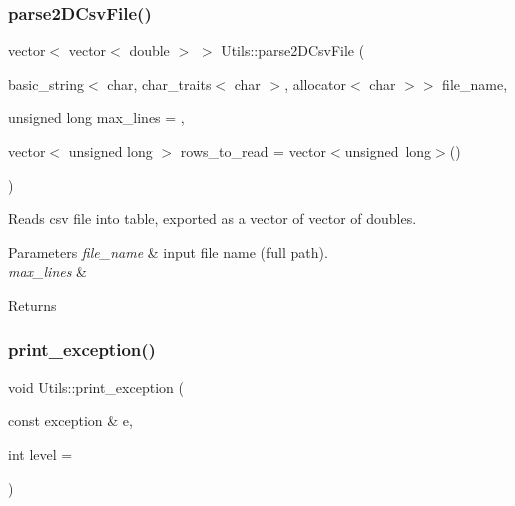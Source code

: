 \subsubsection{\texorpdfstring{parse2\+D\+Csv\+File()}{parse2DCsvFile()}}
{\footnotesize\ttfamily vector$<$ vector$<$ double $>$ $>$ Utils\+::parse2\+D\+Csv\+File (\begin{DoxyParamCaption}\item[{basic\+\_\+string$<$ char, char\+\_\+traits$<$ char $>$, allocator$<$ char $>$$>$}]{file\+\_\+name,  }\item[{unsigned long}]{max\+\_\+lines = {},  }\item[{vector$<$ unsigned long $>$}]{rows\+\_\+to\+\_\+read = {\ttfamily vector$<$unsigned~long$>$()} }\end{DoxyParamCaption})\hspace{0.3cm}{\ttfamily [static]}}

Reads csv file into table, exported as a vector of vector of doubles. 
\begin{DoxyParams}{Parameters}
{\em file\+\_\+name} & input file name (full path). \\
\hline
{\em max\+\_\+lines} & \\
\hline
\end{DoxyParams}
\begin{DoxyReturn}{Returns}

\end{DoxyReturn}
\mbox{\label{classUtils_a0ce3051b18a14aad2608d31e25b5fdca_a0ce3051b18a14aad2608d31e25b5fdca}} 
\subsubsection{\texorpdfstring{print\+\_\+exception()}{print\_exception()}}
{\footnotesize\ttfamily void Utils\+::print\+\_\+exception (\begin{DoxyParamCaption}\item[{const exception \&}]{e,  }\item[{int}]{level = {} }\end{DoxyParamCaption})\hspace{0.3cm}{\ttfamily [static]}}

\mbox{\label{classUtils_a01a90cec5c722c66a0d75d051f48dd03_a01a90cec5c722c66a0d75d051f48dd03}} 
